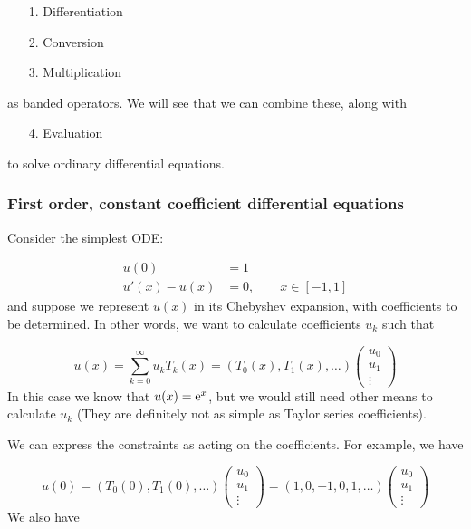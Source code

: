 \documentclass[12pt,a4paper]{article}
\def\E{ {\rm e} }
\begin{document}
\begin{itemize}
\item[1. ] Differentiation


\item[2. ] Conversion


\item[3. ] Multiplication

\end{itemize}
as banded operators. We will see that we can combine these, along with

\begin{itemize}
\item[4. ] Evaluation

\end{itemize}
to solve ordinary differential equations.

\subsubsection{First order, constant coefficient differential equations}
Consider the simplest ODE:


\begin{align*}
u(0) &= 1 \\
u'(x) - u(x) &= 0, \qquad x \in [-1, 1]
\end{align*}
and suppose we represent $u(x)$ in its Chebyshev expansion, with coefficients to be determined. In other words, we want to calculate coefficients $u_k$ such that

\[
u(x) = \sum_{k=0}^\infty u_k T_k(x) = (T_0(x), T_1(x), \ldots) \begin{pmatrix} u_0 \\ u_1 \\ \vdots \end{pmatrix}
\]
In this case we know that $u(x) = \E^x$, but we would still need other means to calculate $u_k$ (They are definitely not as simple as Taylor series coefficients).

We can express the constraints as acting on the coefficients. For example, we have

\[
u(0) = (T_0(0), T_1(0), \ldots) \begin{pmatrix} u_0\\u_1\\\vdots \end{pmatrix} = (1,0,-1,0,1,\ldots)  \begin{pmatrix} u_0\\u_1\\\vdots \end{pmatrix}
\]
We also have
\end{document}
